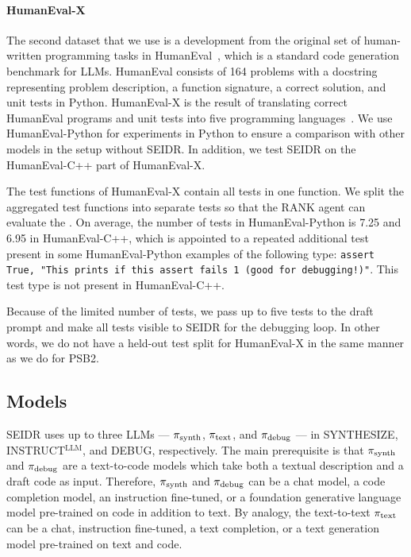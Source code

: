 \paragraph{HumanEval-X}
The second dataset that we use is a development from the original set of human-written programming tasks in HumanEval~\cite{chenEvaluatingLargeLanguage2021}, which is a standard code generation benchmark for LLMs.
HumanEval consists of 164 problems with a docstring representing problem description, a function signature, a correct solution, and unit tests in Python. 
HumanEval-X is the result of translating correct HumanEval programs and unit tests into five programming languages~\cite{zheng2023:codegeex}. 
We use HumanEval-Python for experiments in Python to ensure a comparison with other models in the setup without SEIDR. 
In addition, we test SEIDR on the HumanEval-C++ part of HumanEval-X. %

The test functions of HumanEval-X contain all tests in one function. We split the aggregated test functions into separate tests so that the RANK agent can evaluate the . 
On average, the number of tests in HumanEval-Python is 7.25 and 6.95 in HumanEval-C++, which is appointed to a repeated additional test present in some HumanEval-Python examples of the following type: \texttt{assert True, "This prints if this assert fails 1 (good for debugging!)"}.
This test type is not present in HumanEval-C++.

Because of the limited number of tests, we pass up to five tests to the draft prompt and make all tests visible to SEIDR for the debugging loop. 
In other words, we do not have a held-out test split for HumanEval-X in the same manner as we do for PSB2.


\newpage\subsection{Models}
\label{sec:seidr-models}

SEIDR uses up to three LLMs --- $ \pi_\text{synth} $, $ \pi_\text{text} $, and $ \pi_\text{debug} $ ---
in SYNTHESIZE, INSTRUCT$^{\text{LLM}}$, and DEBUG, respectively. 
The main prerequisite is that $ \pi_\text{synth} $ and $ \pi_\text{debug} $ are a text-to-code models which take both a textual description and a draft code as input.
Therefore, $ \pi_\text{synth} $ and $ \pi_\text{debug} $ can be a chat model, a code completion model, an instruction fine-tuned, or a foundation generative language model pre-trained on code in addition to text. 
By analogy, the text-to-text $ \pi_\text{text} $ can be a chat, instruction fine-tuned, a text completion, or a text generation model pre-trained on text and code.

